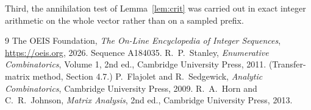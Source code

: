 \documentclass[11pt,a4paper]{article}
\theoremstyle{plain}
\theoremstyle{definition}
\begin{document}
Third, the annihilation test of Lemma~\ref{lem:crit} was carried out in exact integer
arithmetic on the whole vector rather than on a sampled prefix.

\begin{thebibliography}{9}
 The OEIS Foundation, \emph{The On-Line Encyclopedia of Integer
Sequences}, \url{https://oeis.org}, 2026. Sequence A184035.
 R.~P.~Stanley, \emph{Enumerative Combinatorics}, Volume 1, 2nd ed.,
Cambridge University Press, 2011. (Transfer-matrix method, Section 4.7.)
 P.~Flajolet and R.~Sedgewick, \emph{Analytic Combinatorics}, Cambridge
University Press, 2009.
 R.~A.~Horn and C.~R.~Johnson, \emph{Matrix Analysis}, 2nd ed., Cambridge
University Press, 2013.
\end{thebibliography}
\end{document}
